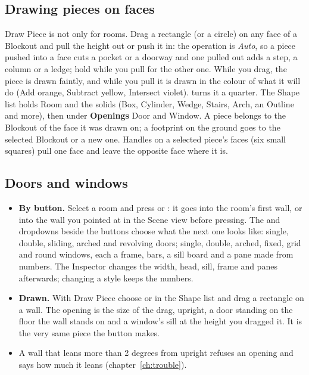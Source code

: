 \subsection*{Drawing pieces on faces}
Draw Piece is not only for rooms. Drag a rectangle (or a circle) on any face of a Blockout and pull the height out or push it
in: the operation is \emph{Auto}, so a piece pushed into a face cuts a pocket or a doorway and one pulled out adds a
step, a column or a ledge; hold  while you pull for the other one. While you drag, the piece is drawn faintly, and
while you pull it is drawn in the colour of what it will do (Add orange, Subtract yellow, Intersect violet).  turns
it a quarter. The Shape list holds Room and the solids (Box, Cylinder, Wedge, Stairs, Arch, an Outline and more), then under
\textbf{Openings} Door and Window. A piece belongs to the Blockout of the face it was drawn on; a footprint on the ground
goes to the selected Blockout or a new one. Handles on a selected piece's faces (six small squares) pull one face and
leave the opposite face where it is.

\subsection*{Doors and windows}
\begin{itemize}
  \item \textbf{By button.} Select a room and press  or : it goes into the room's first wall, or into the
    wall you pointed at in the Scene view before pressing. The  and  dropdowns beside the
    buttons choose what the next one looks like: single, double, sliding, arched and revolving doors; single, double,
    arched, fixed, grid and round windows, each a frame, bars, a sill board and a pane made from numbers. The Inspector
    changes the width, head, sill, frame and panes afterwards; changing a style keeps the numbers.
  \item \textbf{Drawn.} With Draw Piece choose  or  in the Shape list and drag a rectangle on a wall.
    The opening is the size of the drag, upright, a door standing on the floor the wall stands on and a window's sill at the height
    you dragged it. It is the very same piece the button makes.
  \item A wall that leans more than 2 degrees from upright refuses an opening and says how much it leans
    (chapter~\ref{ch:trouble}).
\end{itemize}

